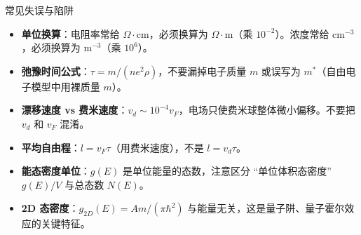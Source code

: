 \begin{errorbox}{常见失误与陷阱}
\begin{itemize}
    \item \textbf{单位换算}：电阻率常给 $\Omega\cdot\text{cm}$，必须换算为 $\Omega\cdot\text{m}$（乘 $10^{-2}$）。浓度常给 $\text{cm}^{-3}$，必须换算为 $\text{m}^{-3}$（乘 $10^6$）。
    \item \textbf{弛豫时间公式}：$\tau=m/(ne^2\rho)$，不要漏掉电子质量 $m$ 或误写为 $m^*$（自由电子模型中用裸质量 $m$）。
    \item \textbf{漂移速度 vs 费米速度}：$v_d\sim 10^{-4}v_F$，电场只使费米球整体微小偏移。不要把 $v_d$ 和 $v_F$ 混淆。
    \item \textbf{平均自由程}：$l=v_F\tau$（用费米速度），不是 $l=v_d\tau$。
    \item \textbf{能态密度单位}：$g(E)$ 是单位能量的态数，注意区分 ``单位体积态密度'' $g(E)/V$ 与总态数 $N(E)$。
    \item \textbf{2D 态密度}：$g_{2D}(E)=Am/(\pi\hbar^2)$ 与能量无关，这是量子阱、量子霍尔效应的关键特征。
\end{itemize}
\end{errorbox}


